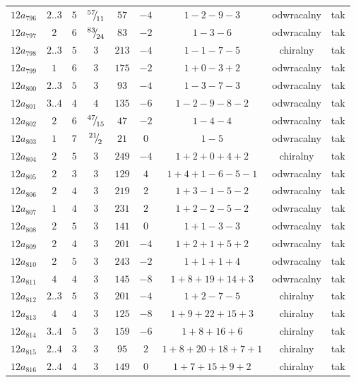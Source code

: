 \begin{longtable}{ccccccccc}
$12a_{796}$ & $2..3$ & $5$ & ${}^{57}{\mskip -5mu/\mskip -3mu}_{11}$ & $57$ & $-4$ & $1-2-9-3$ & odwracalny & tak \\
$12a_{797}$ & $2$ & $6$ & ${}^{83}{\mskip -5mu/\mskip -3mu}_{24}$ & $83$ & $-2$ & $1-3-6$ & odwracalny & tak \\
$12a_{798}$ & $2..3$ & $5$ & $3$ & $213$ & $-4$ & $1-1-7-5$ & chiralny & tak \\
$12a_{799}$ & $1$ & $6$ & $3$ & $175$ & $-2$ & $1+0-3+2$ & odwracalny & tak \\
$12a_{800}$ & $2..3$ & $5$ & $3$ & $93$ & $-4$ & $1-3-7-3$ & odwracalny & tak \\
$12a_{801}$ & $3..4$ & $4$ & $4$ & $135$ & $-6$ & $1-2-9-8-2$ & odwracalny & tak \\
$12a_{802}$ & $2$ & $6$ & ${}^{47}{\mskip -5mu/\mskip -3mu}_{15}$ & $47$ & $-2$ & $1-4-4$ & odwracalny & tak \\
$12a_{803}$ & $1$ & $7$ & ${}^{21}{\mskip -5mu/\mskip -3mu}_{2}$ & $21$ & $0$ & $1-5$ & odwracalny & tak \\
$12a_{804}$ & $2$ & $5$ & $3$ & $249$ & $-4$ & $1+2+0+4+2$ & chiralny & tak \\
$12a_{805}$ & $2$ & $3$ & $3$ & $129$ & $4$ & $1+4+1-6-5-1$ & odwracalny & tak \\
$12a_{806}$ & $2$ & $4$ & $3$ & $219$ & $2$ & $1+3-1-5-2$ & odwracalny & tak \\
$12a_{807}$ & $1$ & $4$ & $3$ & $231$ & $2$ & $1+2-2-5-2$ & odwracalny & tak \\
$12a_{808}$ & $2$ & $5$ & $3$ & $141$ & $0$ & $1+1-3-3$ & odwracalny & tak \\
$12a_{809}$ & $2$ & $4$ & $3$ & $201$ & $-4$ & $1+2+1+5+2$ & odwracalny & tak \\
$12a_{810}$ & $2$ & $5$ & $3$ & $243$ & $-2$ & $1+1+1+4$ & odwracalny & tak \\
$12a_{811}$ & $4$ & $4$ & $3$ & $145$ & $-8$ & $1+8+19+14+3$ & odwracalny & tak \\
$12a_{812}$ & $2..3$ & $5$ & $3$ & $201$ & $-4$ & $1+2-7-5$ & chiralny & tak \\
$12a_{813}$ & $4$ & $4$ & $3$ & $125$ & $-8$ & $1+9+22+15+3$ & chiralny & tak \\
$12a_{814}$ & $3..4$ & $5$ & $3$ & $159$ & $-6$ & $1+8+16+6$ & chiralny & tak \\
$12a_{815}$ & $2..4$ & $3$ & $3$ & $95$ & $2$ & $1+8+20+18+7+1$ & chiralny & tak \\
$12a_{816}$ & $2..4$ & $4$ & $3$ & $149$ & $0$ & $1+7+15+9+2$ & chiralny & tak \\

\end{longtable}
